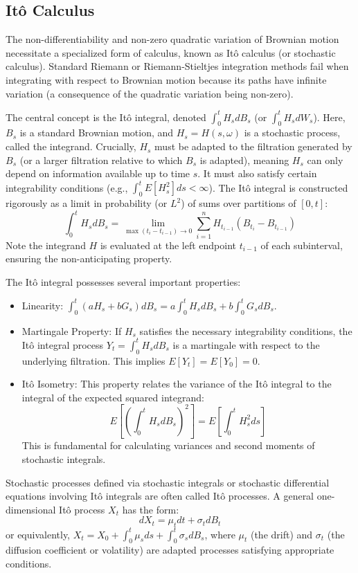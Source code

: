 \documentclass[11pt,twoside,openright]{report}
\begin{document}
\subsection{Itô Calculus}
\label{subsec:ito_calculus}

The non-differentiability and non-zero quadratic variation of Brownian motion necessitate a specialized form of calculus, known as Itô calculus (or stochastic calculus). Standard Riemann or Riemann-Stieltjes integration methods fail when integrating with respect to Brownian motion because its paths have infinite variation (a consequence of the quadratic variation being non-zero).

The central concept is the Itô integral, denoted $\int_0^t H_s dB_s$ (or $\int_0^t H_s dW_s$). Here, $B_s$ is a standard Brownian motion, and $H_s = H(s, \omega)$ is a stochastic process, called the integrand. Crucially, $H_s$ must be adapted to the filtration generated by $B_s$ (or a larger filtration relative to which $B_s$ is adapted), meaning $H_s$ can only depend on information available up to time $s$. It must also satisfy certain integrability conditions (e.g., $\int_0^t E[H_s^2] ds < \infty$). The Itô integral is constructed rigorously as a limit in probability (or $L^2$) of sums over partitions of $[0, t]$:
\[ \int_0^t H_s dB_s = \lim_{\max(t_i - t_{i-1}) \to 0} \sum_{i=1}^n H_{t_{i-1}} (B_{t_i} - B_{t_{i-1}}) \]
Note the integrand $H$ is evaluated at the left endpoint $t_{i-1}$ of each subinterval, ensuring the non-anticipating property.

The Itô integral possesses several important properties:
\begin{itemize}
    \item Linearity: $\int_0^t (a H_s + b G_s) dB_s = a \int_0^t H_s dB_s + b \int_0^t G_s dB_s$.
    \item Martingale Property: If $H_s$ satisfies the necessary integrability conditions, the Itô integral process $Y_t = \int_0^t H_s dB_s$ is a martingale with respect to the underlying filtration. This implies $E[Y_t] = E[Y_0] = 0$.
    \item Itô Isometry: This property relates the variance of the Itô integral to the integral of the expected squared integrand:
    \[ E\left[ \left( \int_0^t H_s dB_s \right)^2 \right] = E\left[ \int_0^t H_s^2 ds \right] \]
    This is fundamental for calculating variances and second moments of stochastic integrals.
\end{itemize}
Stochastic processes defined via stochastic integrals or stochastic differential equations involving Itô integrals are often called Itô processes. A general one-dimensional Itô process $X_t$ has the form:
\[ dX_t = \mu_t dt + \sigma_t dB_t \]
or equivalently, $X_t = X_0 + \int_0^t \mu_s ds + \int_0^t \sigma_s dB_s$, where $\mu_t$ (the drift) and $\sigma_t$ (the diffusion coefficient or volatility) are adapted processes satisfying appropriate conditions.
\end{document}
